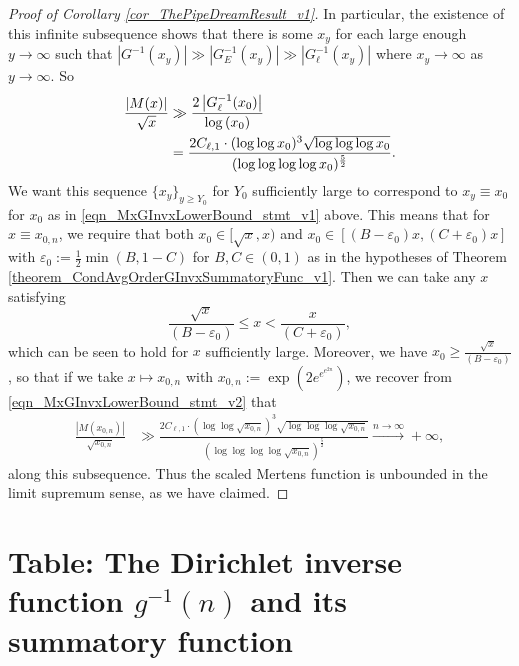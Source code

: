 \documentclass[11pt,reqno,a4letter]{article}
\numberwithin{figure}{section}
\numberwithin{table}{section}
\theoremstyle{plain}
\numberwithin{theorem}{section}
\theoremstyle{definition}
\begin{document}
\begin{proof}[Proof of Corollary \ref{cor_ThePipeDreamResult_v1}]
In particular, the existence of this infinite subsequence 
shows that there is some $x_y$ for each large enough $y \rightarrow \infty$ 
such that $|G^{-1}(x_y)| \gg |G_E^{-1}(x_y)| \gg |G_{\ell}^{-1}(x_y)|$ where 
$x_y \rightarrow \infty$ as $y \rightarrow \infty$. So 
\begin{align} 
\notag 
\frac{|M(x)|}{\sqrt{x}} & \gg \frac{2 \left\lvert G_{\ell}^{-1}(x_0) \right\rvert}{\log\left(x_0\right)} \\ 
\label{eqn_MxGInvxLowerBound_stmt_v2} 
     & = \frac{2 C_{\ell,1} \cdot (\log\log x_0)^{3} \sqrt{\log\log\log x_0}}{ 
     (\log\log\log\log x_0)^{\frac{5}{2}}}. 
\end{align} 
We want this sequence $\{x_y\}_{y \geq Y_0}$ for $Y_0$ sufficiently large to correspond to 
$x_y \equiv x_0$ for $x_0$ as in \eqref{eqn_MxGInvxLowerBound_stmt_v1} above. 
This means that for $x \equiv x_{0,n}$, we require that both 
$x_0 \in [\sqrt{x}, x)$ and $x_0 \in [(B-\varepsilon_0) x, (C+\varepsilon_0) x]$ with 
$\varepsilon_0 := \frac{1}{2} \min(B, 1-C)$ for $B, C \in (0, 1)$ as in the hypotheses of 
Theorem \ref{theorem_CondAvgOrderGInvxSummatoryFunc_v1}. 
Then we can take any $x$ satisfying 
\[
\frac{\sqrt{x}}{(B-\varepsilon_0)} \leq x < \frac{x}{(C+\varepsilon_0)}, 
\]
which can be seen to hold for $x$ sufficiently large. 
Moreover, we have $x_0 \geq \frac{\sqrt{x}}{(B-\varepsilon_0)}$, so that 
if we take $x \mapsto x_{0,n}$ with $x_{0,n} := \exp\left(2e^{e^{e^{2n}}}\right)$, 
we recover from \eqref{eqn_MxGInvxLowerBound_stmt_v2} that 
\begin{align} 
\label{eqn_MxGInvxLowerBound_stmt_v3} 
\frac{|M(x_{0,n})|}{\sqrt{x_{0,n}}} & \gg 
     \frac{2 C_{\ell,1} \cdot (\log\log \sqrt{x_{0,n}})^{3} \sqrt{ \log\log\log \sqrt{x_{0,n}} } }{ 
     (\log\log\log\log \sqrt{x_{0,n}})^{\frac{5}{2}}} \xrightarrow{n \rightarrow \infty} +\infty, 
\end{align} 
along this subsequence. Thus the scaled Mertens function is 
unbounded in the limit supremum sense, as we have claimed. 
\end{proof} 

\newpage 
\renewcommand{\refname}{References} 
{}


\newpage
\setcounter{section}{0} 
\renewcommand{\thesection}{T.\arabic{section}} 

\newpage
\section{Table: The Dirichlet inverse function $g^{-1}(n)$ and its summatory function} 
\label{table_conjecture_Mertens_ginvSeq_approx_values}
\end{document}
